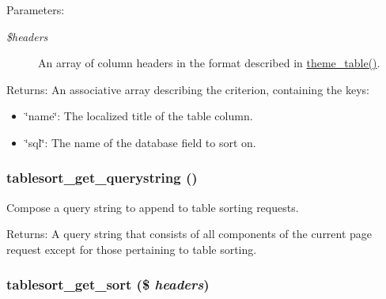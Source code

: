 \begin{Desc}
\item[Parameters:]
\begin{description}
\item[{\em \$headers}]An array of column headers in the format described in \hyperlink{group__themeable_g77f053aaa73bbeaa3943bf8f06ce625d}{theme\_\-table()}. \end{description}
\end{Desc}
\begin{Desc}
\item[Returns:]An associative array describing the criterion, containing the keys:\begin{itemize}
\item \char`\"{}name\char`\"{}: The localized title of the table column.\item \char`\"{}sql\char`\"{}: The name of the database field to sort on. \end{itemize}
\end{Desc}
\hypertarget{tablesort_8inc_028ba1bfddfb391f52b8795d17e5593f}{
\subsubsection[{tablesort\_\-get\_\-querystring}]{\setlength{\rightskip}{0pt plus 5cm}tablesort\_\-get\_\-querystring ()}}
\label{tablesort_8inc_028ba1bfddfb391f52b8795d17e5593f}


Compose a query string to append to table sorting requests.

\begin{Desc}
\item[Returns:]A query string that consists of all components of the current page request except for those pertaining to table sorting. \end{Desc}
\hypertarget{tablesort_8inc_e0824a39d518b2e6dc8e603093be2146}{
\subsubsection[{tablesort\_\-get\_\-sort}]{\setlength{\rightskip}{0pt plus 5cm}tablesort\_\-get\_\-sort (\$ {\em headers})}}
\label{tablesort_8inc_e0824a39d518b2e6dc8e603093be2146}


